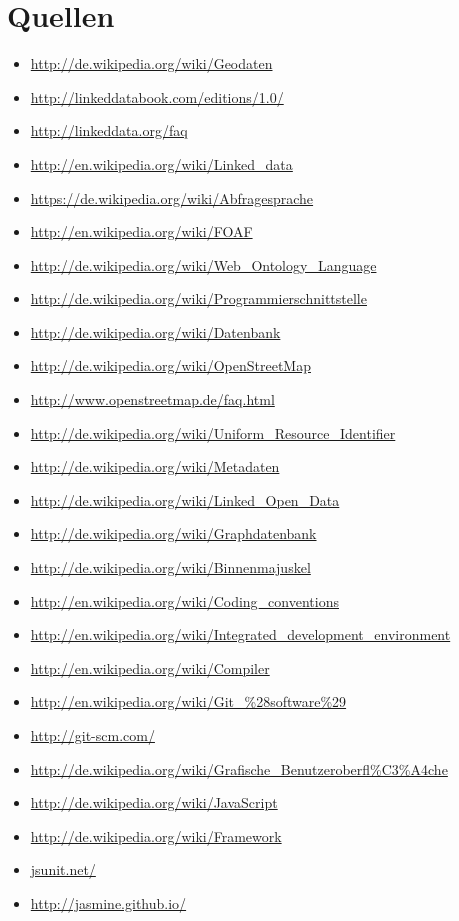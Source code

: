 \documentclass[11pt,a4paper]{article}
\begin{document}
\section{Quellen}
\begin{itemize}
\item \url{http://de.wikipedia.org/wiki/Geodaten}
\item \url{http://linkeddatabook.com/editions/1.0/}
\item \url{http://linkeddata.org/faq}
\item \url{http://en.wikipedia.org/wiki/Linked_data}
\item \url{https://de.wikipedia.org/wiki/Abfragesprache}
\item \url{http://en.wikipedia.org/wiki/FOAF}
\item \url{http://de.wikipedia.org/wiki/Web_Ontology_Language}
\item \url{http://de.wikipedia.org/wiki/Programmierschnittstelle}
\item \url{http://de.wikipedia.org/wiki/Datenbank}
\item \url{http://de.wikipedia.org/wiki/OpenStreetMap}
\item \url{http://www.openstreetmap.de/faq.html}
\item \url{http://de.wikipedia.org/wiki/Uniform_Resource_Identifier}
\item \url{http://de.wikipedia.org/wiki/Metadaten}
\item \url{http://de.wikipedia.org/wiki/Linked_Open_Data}
\item \url{http://de.wikipedia.org/wiki/Graphdatenbank}
\item \url{http://de.wikipedia.org/wiki/Binnenmajuskel}
\item \url{http://en.wikipedia.org/wiki/Coding_conventions}
\item \url{http://en.wikipedia.org/wiki/Integrated_development_environment}
\item \url{http://en.wikipedia.org/wiki/Compiler}
\item \url{http://en.wikipedia.org/wiki/Git_%28software%29}
\item \url{http://git-scm.com/}
\item \url{http://de.wikipedia.org/wiki/Grafische_Benutzeroberfl%C3%A4che}
\item \url{http://de.wikipedia.org/wiki/JavaScript}
\item \url{http://de.wikipedia.org/wiki/Framework}
\item \url{jsunit.net/}
\item \url{http://jasmine.github.io/}

\end{itemize}
\end{document}
